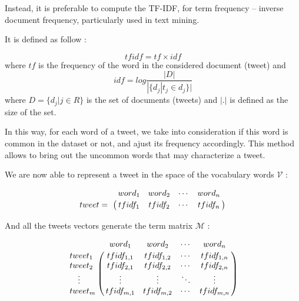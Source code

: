 \documentclass[a4paper,twoside,12pt,openright]{report}
\begin{document}
Instead, it is preferable to compute the TF-IDF, for term frequency – inverse document frequency, particularly used in text mining.

It is defined as follow : 

$$tfidf = tf \times idf$$ 
where 
$tf$ is the frequency of the word in the considered document (tweet) and
$$idf = log \frac{|D|}{|\{d_j | t_j \in d_j\}|}$$
where $D = \{d_j | j\in R\} $ is the set of documents (tweets) and $|.|$ is defined as the size of the set.

In this way, for each word of a tweet, we take into consideration if this word is common in the dataset or not, and ajust its frequency accordingly. This method allows to bring out the uncommon words that may characterize a tweet.

We are now able to represent a tweet in the space of the vocabulary words $\mathcal{V}$ :

\[
\bordermatrix{~ & word_1 & word_2 & \cdots & word_n \cr tweet =  & tfidf_1 & tfidf_2 & \cdots & tfidf_n \cr}
\]

And all the tweets vectors generate the term matrix $\mathcal{M}$ :

\[
\bordermatrix{
~ & word_1 & word_2 & \cdots & word_n \cr 
tweet_1 & tfidf_{1,1} & tfidf_{1,2} & \cdots & tfidf_{1,n} \cr
tweet_2 & tfidf_{2,1} & tfidf_{2,2} & \cdots & tfidf_{2,n} \cr
\hspace{10pt} \vdots & \vdots & \vdots & \ddots & \vdots \cr
tweet_m & tfidf_{m,1} & tfidf_{m,2} & \cdots & tfidf_{m,n} \cr
}
\]

\newpage

\end{document}
